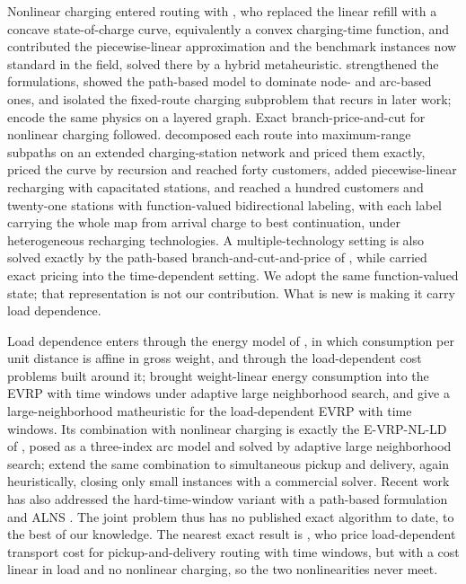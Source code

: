 \documentclass[review,3p,authoryear]{elsarticle}
\theoremstyle{plain}
\theoremstyle{definition}
\theoremstyle{remark}
\begin{document}
Nonlinear charging entered routing with \citet{Montoya2017}, who replaced the linear
refill with a concave state-of-charge curve, equivalently a convex
charging-time function, and contributed the piecewise-linear approximation
and the benchmark instances now standard in the field, solved there by a hybrid
metaheuristic. \citet{Froger2019} strengthened the formulations, showed the
path-based model to dominate node- and arc-based ones, and isolated the fixed-route
charging subproblem that recurs in later work; \citet{Bruni2025} encode the same
physics on a layered graph. Exact branch-price-and-cut for nonlinear charging
followed. \citet{lee2020exact} decomposed each route into maximum-range subpaths on
an extended charging-station network and priced them exactly, \citet{Liang2021}
priced the curve by recursion and
reached forty customers, \citet{Lam2022} added piecewise-linear recharging with
capacitated stations, and \citet{Nafstad2025} reached a hundred customers and
twenty-one stations with function-valued bidirectional labeling, with each label
carrying the whole map from arrival charge to best continuation, under heterogeneous
recharging technologies. A multiple-technology setting is also solved exactly by
the path-based branch-and-cut-and-price of \citet{Ceselli2021}, while
\citet{LeraRomero2024} carried exact pricing into the time-dependent setting. We adopt the same function-valued state; that representation is
not our contribution. What is new is making it carry load dependence.

Load dependence enters through the energy model of \citet{GoekeSchneider2015}, in
which consumption per unit distance is affine in gross weight, and through the
load-dependent cost problems built around it; \citet{kancharla2018adaptive} brought
weight-linear energy consumption into the EVRP with time windows under
adaptive large neighborhood search, and \citet{RastaniCatay2023} give a
large-neighborhood matheuristic for the load-dependent EVRP with time
windows. Its combination with nonlinear charging is exactly the E-VRP-NL-LD of
\citet{KancharlaRamadurai2020}, posed as a three-index arc model and solved by
adaptive large neighborhood search; \citet{Xu2022} extend the same combination to
simultaneous pickup and delivery, again heuristically, closing only small instances
with a commercial solver. Recent work has also addressed the hard-time-window
variant with a path-based formulation and ALNS \citep{Yoshida2026}. The joint
problem thus has no published exact algorithm to date, to the best of our
knowledge. The nearest exact result is \citet{HasseIrnich2025}, who price
load-dependent transport cost for pickup-and-delivery routing with time windows,
but with a cost linear in load and no nonlinear charging, so the two
nonlinearities never meet.
\end{document}
